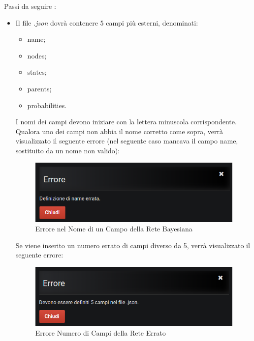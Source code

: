 Passi da seguire :
\begin{itemize}
 \item Il file \textit{.json} dovrà contenere 5 campi più esterni, denominati:
 	\begin{itemize}
 		\item name;
 		\item nodes;
 		\item states;
 		\item parents;
 		\item probabilities.
 	\end{itemize}
 	I nomi dei campi devono iniziare con la lettera minuscola corrispondente. Qualora uno dei campi non abbia il nome corretto come sopra, verrà visualizzato il seguente errore (nel seguente caso mancava il campo name, sostituito da un nome non valido):
 	 
 	\begin{figure}[H]
	\begin{center}
		\includegraphics[scale=0.8]{./images/erroreNomeCampo.png}
		 \caption{Errore nel Nome di un Campo della Rete Bayesiana}	
		 \label{ImgRete}
	\end{center}
\end{figure}

	Se viene inserito un numero errato di campi diverso da 5, verrà visualizzato il seguente errore:
	
	\begin{figure}[H]
	\begin{center}
		\includegraphics[scale=0.8]{./images/wrongNumberOfFields.png}
		 \caption{Errore Numero di Campi della Rete Errato}	
		 \label{ImgRete}
	\end{center}
\end{figure}


\end{itemize}
